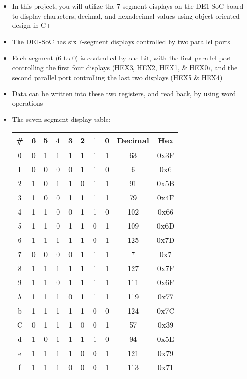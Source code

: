 \begin{itemize}

  \item In this project, you will utilize the 7-segment displays on the DE1-SoC board to display characters, decimal, and hexadecimal values using object oriented design in C++

  \item The DE1-SoC has six 7-segment displays controlled by two parallel ports

  \item Each segment (6 to 0) is controlled by one bit, with the first parallel port controlling the first four displays (HEX3, HEX2, HEX1, \& HEX0), and the second parallel port controlling the last two displays (HEX5 \& HEX4)

  \item Data can be written into these two registers, and read back, by using word operations

  \item The seven segment display table:

    \begin{center}
      \begin{tabular}[h!]{| c | c | c | c | c | c | c | c | c | c |}
        \hline
        \# & 6 & 5 & 4 & 3 & 2 & 1 & 0 & Decimal & Hex \\
        \hline
        0 & 0 & 1 & 1 & 1 & 1 & 1 & 1 & 63 & 0x3F\\
        \hline
        1 & 0 & 0 & 0 & 0 & 1 & 1 & 0 & 6 & 0x6\\
        \hline
        2 & 1 & 0 & 1 & 1 & 0 & 1 & 1 & 91 & 0x5B\\
        \hline
        3 & 1 & 0 & 0 & 1 & 1 & 1 & 1 & 79 & 0x4F\\
        \hline
        4 & 1 & 1 & 0 & 0 & 1 & 1 & 0 & 102 & 0x66\\
        \hline
        5 & 1 & 1 & 0 & 1 & 1 & 0 & 1 & 109 & 0x6D\\
        \hline
        6 & 1 & 1 & 1 & 1 & 1 & 0 & 1 & 125 & 0x7D\\
        \hline
        7 & 0 & 0 & 0 & 0 & 1 & 1 & 1 & 7 & 0x7\\
        \hline
        8 & 1 & 1 & 1 & 1 & 1 & 1 & 1 & 127 & 0x7F\\
        \hline
        9 & 1 & 1 & 0 & 1 & 1 & 1 & 1 & 111 & 0x6F\\
        \hline
        A & 1 & 1 & 1 & 0 & 1 & 1 & 1 & 119 & 0x77\\
        \hline
        b & 1 & 1 & 1 & 1 & 1 & 0 & 0 & 124 & 0x7C\\
        \hline
        C & 0 & 1 & 1 & 1 & 0 & 0 & 1 & 57 & 0x39\\
        \hline
        d & 1 & 0 & 1 & 1 & 1 & 1 & 0 & 94 & 0x5E\\
        \hline
        e & 1 & 1 & 1 & 1 & 0 & 0 & 1 & 121 & 0x79\\
        \hline
        f & 1 & 1 & 1 & 0 & 0 & 0 & 1 & 113 & 0x71\\
        \hline
      \end{tabular}
    \end{center}


\end{itemize}

